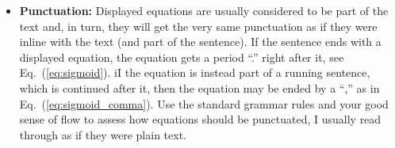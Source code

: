 \begin{itemize}
\begin{equation}
\sigma(x) = \left ( \frac{1}{1+e^{-x}} \right ).
\end{equation} 
\item \textbf{Punctuation:} Displayed equations are usually considered to be part of the text and, in turn, they will get the very same punctuation as if they were inline with the text (and part of the sentence). If the sentence ends with a displayed equation, the equation gets a period ``.'' right after it, see Eq.~(\ref{eq:sigmoid}). iI the equation is instead part of a running sentence, which is continued after it, then the equation may be ended by a ``,'' as in Eq.~(\ref{eq:sigmoid_comma}). Use the standard grammar rules and your good sense of flow to assess how equations should be punctuated, I usually read through as if they were plain text.
\end{itemize} 

